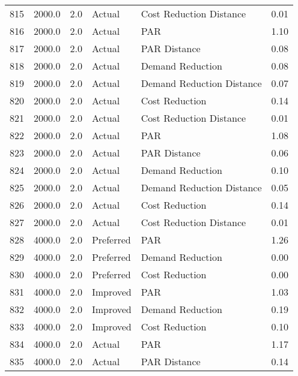 \begin{longtable}{lrrllr}
815  &       2000.0 &     2.0 &         Actual &    Cost Reduction Distance &   0.01 \\
816  &       2000.0 &     2.0 &         Actual &                        PAR &   1.10 \\
817  &       2000.0 &     2.0 &         Actual &               PAR Distance &   0.08 \\
818  &       2000.0 &     2.0 &         Actual &           Demand Reduction &   0.08 \\
819  &       2000.0 &     2.0 &         Actual &  Demand Reduction Distance &   0.07 \\
820  &       2000.0 &     2.0 &         Actual &             Cost Reduction &   0.14 \\
821  &       2000.0 &     2.0 &         Actual &    Cost Reduction Distance &   0.01 \\
822  &       2000.0 &     2.0 &         Actual &                        PAR &   1.08 \\
823  &       2000.0 &     2.0 &         Actual &               PAR Distance &   0.06 \\
824  &       2000.0 &     2.0 &         Actual &           Demand Reduction &   0.10 \\
825  &       2000.0 &     2.0 &         Actual &  Demand Reduction Distance &   0.05 \\
826  &       2000.0 &     2.0 &         Actual &             Cost Reduction &   0.14 \\
827  &       2000.0 &     2.0 &         Actual &    Cost Reduction Distance &   0.01 \\
828  &       4000.0 &     2.0 &      Preferred &                        PAR &   1.26 \\
829  &       4000.0 &     2.0 &      Preferred &           Demand Reduction &   0.00 \\
830  &       4000.0 &     2.0 &      Preferred &             Cost Reduction &   0.00 \\
831  &       4000.0 &     2.0 &       Improved &                        PAR &   1.03 \\
832  &       4000.0 &     2.0 &       Improved &           Demand Reduction &   0.19 \\
833  &       4000.0 &     2.0 &       Improved &             Cost Reduction &   0.10 \\
834  &       4000.0 &     2.0 &         Actual &                        PAR &   1.17 \\
835  &       4000.0 &     2.0 &         Actual &               PAR Distance &   0.14 \\

\end{longtable}
